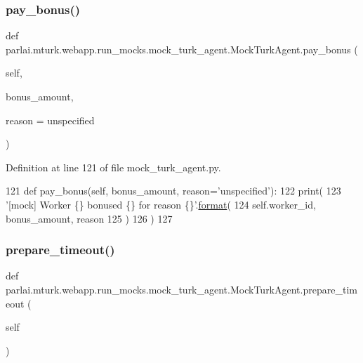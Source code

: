 \subsubsection{\texorpdfstring{pay\+\_\+bonus()}{pay\_bonus()}}
{\footnotesize\ttfamily def parlai.\+mturk.\+webapp.\+run\+\_\+mocks.\+mock\+\_\+turk\+\_\+agent.\+Mock\+Turk\+Agent.\+pay\+\_\+bonus (\begin{DoxyParamCaption}\item[{}]{self,  }\item[{}]{bonus\+\_\+amount,  }\item[{}]{reason = {\ttfamily \textquotesingle{}unspecified\textquotesingle{}} }\end{DoxyParamCaption})}



Definition at line 121 of file mock\+\_\+turk\+\_\+agent.\+py.


\begin{DoxyCode}
121     \textcolor{keyword}{def }pay\_bonus(self, bonus\_amount, reason='unspecified'):
122         print(
123             \textcolor{stringliteral}{'[mock] Worker \{\} bonused \{\} for reason \{\}'}.\hyperlink{namespaceparlai_1_1chat__service_1_1services_1_1messenger_1_1shared__utils_a32e2e2022b824fbaf80c747160b52a76}{format}(
124                 self.worker\_id, bonus\_amount, reason
125             )
126         )
127 
\end{DoxyCode}
\mbox{\label{classparlai_1_1mturk_1_1webapp_1_1run__mocks_1_1mock__turk__agent_1_1MockTurkAgent_a30989dcb772a11368d64a9d8994e4439}} 
\subsubsection{\texorpdfstring{prepare\+\_\+timeout()}{prepare\_timeout()}}
{\footnotesize\ttfamily def parlai.\+mturk.\+webapp.\+run\+\_\+mocks.\+mock\+\_\+turk\+\_\+agent.\+Mock\+Turk\+Agent.\+prepare\+\_\+timeout (\begin{DoxyParamCaption}\item[{}]{self }\end{DoxyParamCaption})}

